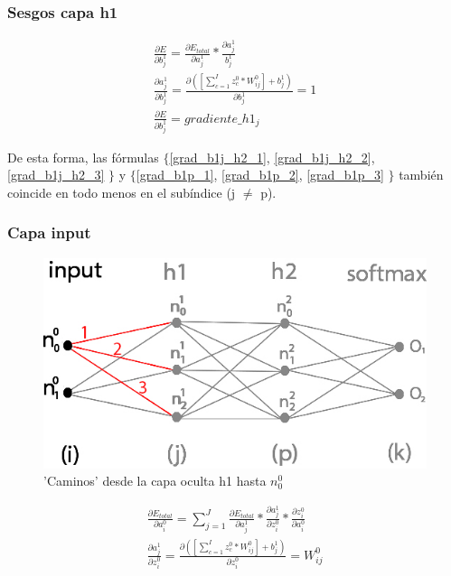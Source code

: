 \subsubsection{Sesgos capa h1}

\begin{gather}
	\frac{\partial E}{\partial b^1_j} = \frac{\partial E_{total} }{\partial a^1_j } * \frac{\partial a^1_j}{b^1_j} \label{grad_b1j_h2_1} \\
	\frac{\partial a^1_j }{\partial b^1_j } = \frac{\partial ([\sum_{c=1}^{I} z^0_c * W^0_{ij}] + b^1_j) }{\partial b^1_j } = 1 \label{grad_b1j_h2_2} \\
	\frac{\partial E}{\partial b^1_j} = gradiente\_h1_j
	\label{grad_b1j_h2_3}
\end{gather}

De esta forma, las fórmulas $\{$\ref{grad_b1j_h2_1}, \ref{grad_b1j_h2_2}, \ref{grad_b1j_h2_3} $\}$ y $\{$\ref{grad_b1p_1}, \ref{grad_b1p_2}, \ref{grad_b1p_3} $\}$ también coincide en todo menos en el subíndice (j $\neq$ p).

\subsubsection{Capa input}

\begin{figure}[H]
	\centering
	\includegraphics[scale=0.35]{imagenes/nn_2_capas_caminos_posibles_input.jpg}  
	\caption{'Caminos' desde la capa oculta h1 hasta $n^0_0$}
	\label{nn_2_capas_caminos_posibles_input}
\end{figure}

\begin{gather}
	\frac{\partial E_{total}}{\partial a^0_i} = \sum_{j=1}^J \frac{\partial E_{total}}{\partial a^1_j} * \frac{\partial a^1_j}{\partial z^0_i} * \frac{\partial z^0_i}{\partial a^0_i} \label{grad_a_h2_1} \\
	\frac{\partial a^1_j }{\partial z^0_i } = \frac{\partial ([\sum_{c=1}^{I} z^0_c * W^0_{ij}] + b^1_j) }{\partial z^0_i } = W^0_{ij} \label{grad_a_h2_2}
\end{gather}

